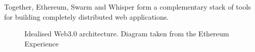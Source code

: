 Together, Ethereum, Swarm and Whisper form a complementary stack of tools for building completely distributed web applications.\\ 
\begin{figure}
\centering
{}
\decoRule
\caption[Idealised Web3.0 Architecture]{Idealised Web3.0 architecture. Diagram taken from the Ethereum Experience \cite{Web3Slides}}
\label{fig:DappArch}
\end{figure}

